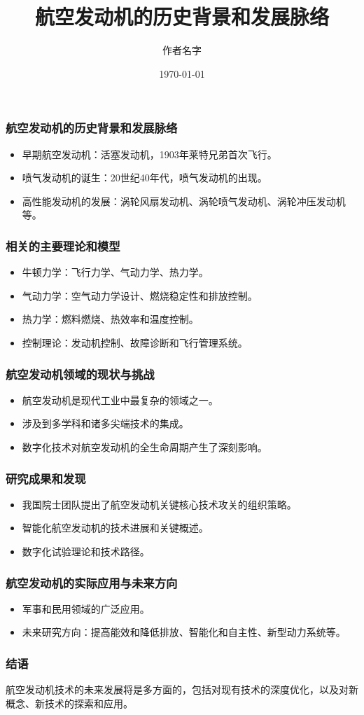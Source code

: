 \documentclass{beamer}
\title{航空发动机的历史背景和发展脉络}
\author{作者名字}
\institute{机构名称}
\date{\today}
\begin{document}
\begin{frame}
  \titlepage
\end{frame}

\begin{frame}
  \frametitle{航空发动机的历史背景和发展脉络}
  \begin{itemize}
    \item 早期航空发动机：活塞发动机，1903年莱特兄弟首次飞行。
    \item 喷气发动机的诞生：20世纪40年代，喷气发动机的出现。
    \item 高性能发动机的发展：涡轮风扇发动机、涡轮喷气发动机、涡轮冲压发动机等。
  \end{itemize}
\end{frame}

\begin{frame}
  \frametitle{相关的主要理论和模型}
  \begin{itemize}
    \item 牛顿力学：飞行力学、气动力学、热力学。
    \item 气动力学：空气动力学设计、燃烧稳定性和排放控制。
    \item 热力学：燃料燃烧、热效率和温度控制。
    \item 控制理论：发动机控制、故障诊断和飞行管理系统。
  \end{itemize}
\end{frame}

\begin{frame}
  \frametitle{航空发动机领域的现状与挑战}
  \begin{itemize}
    \item 航空发动机是现代工业中最复杂的领域之一。
    \item 涉及到多学科和诸多尖端技术的集成。
    \item 数字化技术对航空发动机的全生命周期产生了深刻影响。
  \end{itemize}
\end{frame}

\begin{frame}
  \frametitle{研究成果和发现}
  \begin{itemize}
    \item 我国院士团队提出了航空发动机关键核心技术攻关的组织策略。
    \item 智能化航空发动机的技术进展和关键概述。
    \item 数字化试验理论和技术路径。
  \end{itemize}
\end{frame}

\begin{frame}
  \frametitle{航空发动机的实际应用与未来方向}
  \begin{itemize}
    \item 军事和民用领域的广泛应用。
    \item 未来研究方向：提高能效和降低排放、智能化和自主性、新型动力系统等。
  \end{itemize}
\end{frame}

\begin{frame}
  \frametitle{结语}
  航空发动机技术的未来发展将是多方面的，包括对现有技术的深度优化，以及对新概念、新技术的探索和应用。
\end{frame}
\end{document}
